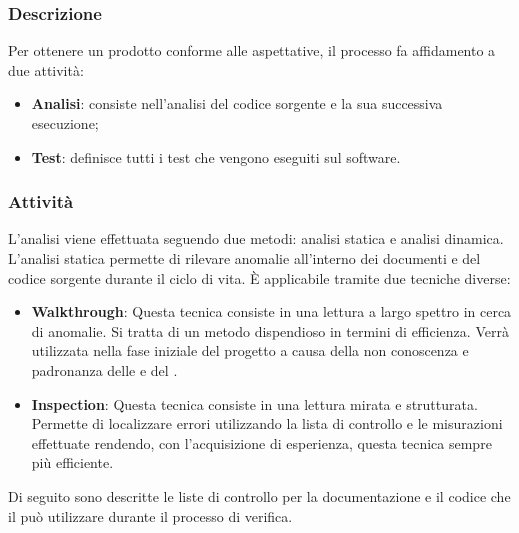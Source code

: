         \subsubsection{Descrizione}
        Per ottenere un prodotto conforme alle aspettative, il processo fa affidamento a due attività:
            \begin{itemize}
                    \item\textbf{Analisi}: consiste nell'analisi del codice sorgente e la sua successiva esecuzione;
                    \item\textbf{Test}: definisce tutti i test che vengono eseguiti sul software.
            \end{itemize}

        \subsubsection{Attività}
            L'analisi viene effettuata seguendo due metodi: analisi statica e analisi dinamica.
                L'analisi statica permette di rilevare anomalie all'interno dei documenti e del codice sorgente durante il ciclo di vita.
                È applicabile tramite due tecniche diverse:
                    \begin{itemize}
                        \item\textbf{Walkthrough}: Questa tecnica consiste in una lettura a largo spettro in cerca di anomalie. Si tratta di un metodo dispendioso in termini di efficienza. Verrà utilizzata nella fase iniziale del progetto a causa della non conoscenza e padronanza delle \docNameNdP{} e del \docNamePdQ{}.  
                        \item\textbf{Inspection}: Questa tecnica consiste in una lettura mirata e strutturata. Permette di localizzare errori utilizzando la lista di controllo e le misurazioni effettuate rendendo, con l'acquisizione di esperienza, questa tecnica sempre più efficiente.
                    \end{itemize}
                    Di seguito sono descritte le liste di controllo per la documentazione e il codice che il \roleVerifier{} può utilizzare durante il processo di verifica.
